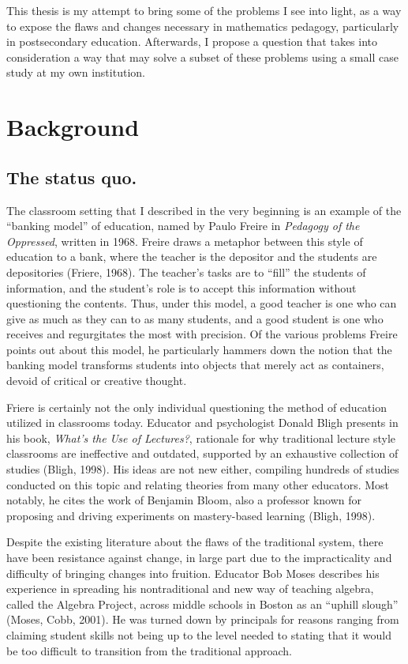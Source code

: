 This thesis is my attempt to bring some of the problems I see into light, as a way to expose the flaws and changes necessary in mathematics pedagogy, particularly in postsecondary education. Afterwards, I propose a question that takes into consideration a way that may solve a subset of these problems using a small case study at my own institution.

\section{Background}
\subsection{The status quo.}

The classroom setting that I described in the very beginning is an example of the ``banking model'' of education, named by Paulo Freire in {\it Pedagogy of the Oppressed}, written in 1968. Freire draws a metaphor between this style of education to a bank, where the teacher is the depositor and the students are depositories (Friere, 1968). The teacher's tasks are to ``fill'' the students of information, and the student's role is to accept this information without questioning the contents. Thus, under this model, a good teacher is one who can give as much as they can to as many students, and a good student is one who receives and regurgitates the most with precision. Of the various problems Freire points out about this model, he particularly hammers down the notion that the banking model transforms students into objects that merely act as containers, devoid of critical or creative thought.

Friere is certainly not the only individual questioning the method of education utilized in classrooms today. Educator and psychologist Donald Bligh presents in his book, {\it What's the Use of Lectures?}, rationale for why traditional lecture style classrooms are ineffective and outdated, supported by an exhaustive collection of studies (Bligh, 1998). His ideas are not new either, compiling hundreds of studies conducted on this topic and relating theories from many other educators. Most notably, he cites the work of Benjamin Bloom, also a professor known for proposing and driving experiments on mastery-based learning (Bligh, 1998).

Despite the existing literature about the flaws of the traditional system, there have been resistance against change, in large part due to the impracticality and difficulty of bringing changes into fruition. Educator Bob Moses describes his experience in spreading his nontraditional and new way of teaching algebra, called the Algebra Project, across middle schools in Boston as an ``uphill slough'' (Moses, Cobb, 2001). He was turned down by principals for reasons ranging from claiming student skills not being up to the level needed to stating that it would be too difficult to transition from the traditional approach.

